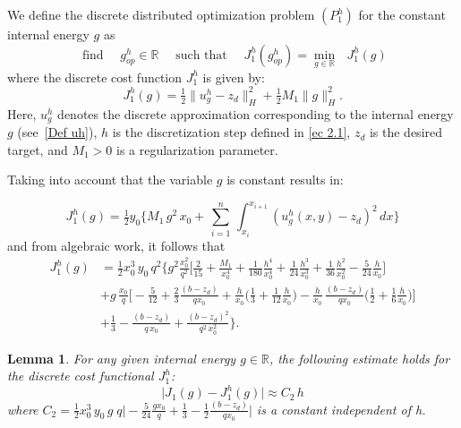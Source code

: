 \documentclass[11pt]{article}
\newcommand{\dee}{d}
\newtheorem{Lemma}{Lemma}
\begin{document}
We define the discrete distributed optimization problem ${(P^h_{1})}$ for the constant internal energy $g$ as 
$$ \text{ find }\quad {g^h_{op}}\in \mathbb{R}\quad\text{ such that }\quad
{J^h_1(g^h_{op})}=\min\limits_{g\in \mathbb{R}} \text{ }{J^h_{1}(g)}
$$
where the discrete cost function  ${J^h_{1}}$ is given by:
    \[{J^h_{1} }(g)=  \tfrac{1}{2} \lVert u^h_g - z_d \rVert^2_H +  \tfrac{1}{2} M_1 \lVert g \rVert ^2_{H} .\]
    {Here, $u^h_g$ denotes the discrete approximation corresponding to the internal energy $g$ (see~\eqref{Def uh}), $h$ is the discretization step defined in \eqref{ec 2.1}, $z_d$ is the desired target, and $M_1>0$ is a regularization parameter. }
    
    
    Taking into account that the variable $g$ is constant results in:
     
\begin{equation}
{J^h_{1}} (g)= \tfrac{1}{2} y_0 \Big\{M_1\,g^2 \,x_0 + \, \sum_{i=1}^n \, \int_{x_i}^{x_{i+1}} \left({u^h_g (x,y) }- z_d\right)^2 \,\dee x \Big \}
\end{equation}
 and from algebraic work, it follows that
\begin{equation}\label{J1h-explicito}   \begin{array}{rl}
    {J^h_{1}(g)}&= \frac{1}{2} x_0^3\, y_0 \,q^2 \Bigg\{g^2 \tfrac{x_0^2}{q^2} \Big[\frac{2}{15}+\tfrac{M_1}{x_0^4}+\frac{1}{180} \tfrac{h^4}{x_0^4}+\frac{1}{24}\tfrac{h^3}{x_0^3}+\frac{1}{36}\tfrac{h^2}{x_0^2}-\frac{5 }{24} \tfrac{h}{x_0}\Big] \\[0.35cm]
&    + g\,\tfrac{x_0}{q} \Big[- \frac{5}{12}+ \frac{2}{3} \tfrac{(b-z_d)}{q x_0}   + \tfrac{h}{x_0}  \Big( \frac{1}{3} +  \frac{1}{12}\tfrac{h}{x_0} \Big) -  \tfrac{h}{x_0} \,\tfrac{(b-z_d)}{qx_0} \Big(  \frac{1}{2} + \tfrac{1}{6}\tfrac{h}{x_0} \Big) \Big] \\[0.35cm]
 &   + \frac{1}{3} - \tfrac{(b-z_d)}{q\,x_0}  + \tfrac{(b-z_d)^2 }{q^2\,x_0^2}\Bigg\}. \end{array}
 \end{equation}
    

    
\begin{Lemma}    \label{Lema:J1(g)-J1h(g)}
{For any given internal energy $g \in \mathbb{R}$, the following estimate holds for the discrete cost functional $J^h_{1}$:}
    \begin{equation}\label{ec 3.3}
       \lvert J_1(g) - {J^h_{1}}(g)\rvert  \approx C_2 \, h 
    \end{equation}
   where  $C_2= \frac{1}{2}x_0^3\, y_0\,g\;  q \Big|-\frac{5}{24} \tfrac{g x_0}{q}+\tfrac{1}{3}-\tfrac{1}{2} \tfrac{(b-z_d)}{qx_0}\Big|$  {is a constant independent of h}.
    \end{Lemma}
  
\end{document}
